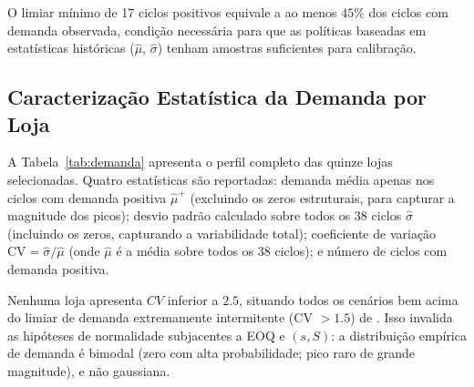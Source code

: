 \documentclass[a4paper,11pt]{article}
\begin{document}
O limiar mínimo de 17 ciclos positivos equivale a ao menos $45\%$
dos ciclos com demanda observada, condição necessária para que as
políticas baseadas em estatísticas históricas ($\hat{\mu}$,
$\hat{\sigma}$) tenham amostras suficientes para calibração.

\subsection{Caracterização Estatística da Demanda por Loja}

A Tabela~\ref{tab:demanda} apresenta o perfil completo das quinze
lojas selecionadas. Quatro estatísticas são reportadas: demanda média
apenas nos ciclos com demanda positiva $\hat{\mu}^+$ (excluindo
os zeros estruturais, para capturar a magnitude dos picos); desvio
padrão calculado sobre todos os 38 ciclos $\hat{\sigma}$ (incluindo
os zeros, capturando a variabilidade total); coeficiente de variação
$\text{CV} = \hat{\sigma}/\hat{\mu}$ (onde $\hat{\mu}$ é a média
sobre todos os 38 ciclos); e número de ciclos com demanda positiva.

Nenhuma loja apresenta $CV$ inferior a $2.5$, situando todos os
cenários bem acima do limiar de demanda extremamente intermitente
(CV $> 1.5$) de \citet{syntetos:2001}. Isso invalida as hipóteses
de normalidade subjacentes a EOQ e $(s,S)$: a distribuição empírica
de demanda é bimodal (zero com alta probabilidade; pico raro de
grande magnitude), e não gaussiana.
\end{document}
